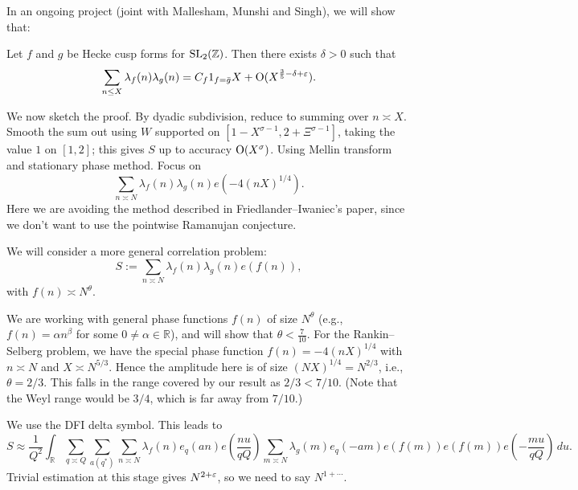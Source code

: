 \documentclass[reqno]{amsart} 
\begin{document}
In an ongoing project (joint with Mallesham, Munshi and Singh), we will show that:
\begin{theorem}
  Let $f$ and $g$ be Hecke cusp forms for $\operatorname{SL}_2(\mathbb{Z})$.  Then there exists $\delta > 0$ such that
  \begin{equation*}
    \sum_{n \leq X} \lambda_f(n) \lambda_g(n) = C_f 1_{f = \bar{g}} X + \operatorname{O}(X^{\frac{3}{5} - \delta + \varepsilon}).
  \end{equation*}
\end{theorem}

We now sketch the proof.  By dyadic subdivision, reduce to summing over $n \asymp X$.  Smooth the sum out using $W$ supported on $[1 - X^{\sigma - 1}, 2 + \Xi^{\sigma - 1}]$, taking the value $1$ on $[1, 2]$; this gives $S$ up to accuracy $\operatorname{O}(X^{\sigma})$.  Using Mellin transform and stationary phase method.  Focus on
\begin{equation*}
  \sum_{n \asymp N} \lambda_f(n) \lambda_g(n) e \left( - 4(n X)^{1/4} \right).
\end{equation*}
Here we are avoiding the method described in Friedlander--Iwaniec's paper, since we don't want to use the pointwise Ramanujan conjecture.


We will consider a more general correlation problem:
\begin{equation*}
  S := \sum_{n \asymp N} \lambda_f(n) \lambda_g(n) e(f(n)),
\end{equation*}
with $f(n) \asymp N^{\theta}$.

We are working with general phase functions $f(n)$ of size $N^{\theta}$ (e.g., $f(n) = \alpha n^\beta$ for some $0 \neq \alpha \in \mathbb{R}$), and will show that $\theta < \frac{7}{10}$.  For the Rankin--Selberg problem, we have the special phase function $f(n) = - 4(n X)^{1/4}$ with $n \asymp N$ and $X \asymp N^{5/3}$.  Hence the amplitude here is of size $(N X)^{1/4} = N^{2/3}$, i.e., $\theta = 2/3$.  This falls in the range covered by our result as $2/3 < 7/10$.  (Note that the Weyl range would be $3/4$, which is far away from $7/10$.)

We use the DFI delta symbol.  This leads to
\begin{equation*}
  S \approx \frac{1}{Q^2}
  \int_{\mathbb{R}}
  \sum_{q \asymp Q}
  \sum_{a(q^\ast)}
  \sum_{n \asymp N}
  \lambda_f(n) e_q(a n) e \left( \frac{n u}{q Q} \right)
  \sum_{m \asymp N} \lambda_g(m) e_{q}(- a m) e(f(m))
  e(f(m))
  e \left( - \frac{m u}{q Q} \right)
  \, d u.
\end{equation*}
Trivial estimation at this stage gives $N^{2 + \varepsilon}$, so we need to say $N^{1 + \dotsb}$.
\end{document}
